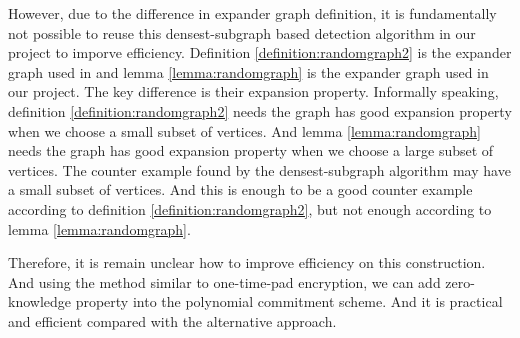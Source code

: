 However, due to the difference in expander graph definition, it is fundamentally not possible to reuse this densest-subgraph based detection algorithm in our project to imporve efficiency. Definition \ref{definition:randomgraph2} is the expander graph used in \cite{orion} and lemma \ref{lemma:randomgraph} is the expander graph used in our project. The key difference is their expansion property. Informally speaking, definition \ref{definition:randomgraph2} needs the graph has good expansion property when we choose a small subset of vertices. And lemma \ref{lemma:randomgraph} needs the graph has good expansion property when we choose a large subset of vertices. The counter example found by the densest-subgraph algorithm may have a small subset of vertices. And this is enough to be a good counter example according to definition \ref{definition:randomgraph2}, but not enough according to lemma \ref{lemma:randomgraph}.

Therefore, it is remain unclear how to improve efficiency on this construction. And using the method similar to one-time-pad encryption, we can add zero-knowledge property into the polynomial commitment scheme. And it is practical and efficient compared with the alternative approach.